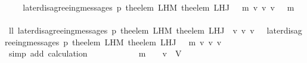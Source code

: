 \begin{isabellebody}
\ \isamarkupfalse%
\ \isamarkupfalse%
\ {\isachardoublequoteopen}later{\isacharunderscore}disagreeing{\isacharunderscore}messages\ {\isacharparenleft}p{\isacharcomma}\ the{\isacharunderscore}elem\ {\isacharparenleft}L{\isacharunderscore}H{\isacharunderscore}M\ {\isacharparenleft}the{\isacharunderscore}elem\ {\isacharparenleft}L{\isacharunderscore}H{\isacharunderscore}J\ {\isacharparenleft}{\isasymsigma}\ {\isasymunion}\ {\isacharbraceleft}m{\isacharbraceright}{\isacharparenright}\ v{\isacharparenright}{\isacharparenright}\ v{\isacharprime}{\isacharparenright}{\isacharcomma}\ v{\isacharprime}{\isacharcomma}\ {\isasymsigma}\ {\isasymunion}\ {\isacharbraceleft}m{\isacharbraceright}{\isacharparenright}\ {\isacharequal}\ {\isasymemptyset}{\isachardoublequoteclose}\isanewline
\ \ \ \ \ \ \isamarkupfalse%
\ {\isacharminus}\isanewline
\ \ \ \ \ \ \ \ \isamarkupfalse%
\ ll{}{\isacharcolon}\ {\isachardoublequoteopen}later{\isacharunderscore}disagreeing{\isacharunderscore}messages\ {\isacharparenleft}p{\isacharcomma}\ the{\isacharunderscore}elem\ {\isacharparenleft}L{\isacharunderscore}H{\isacharunderscore}M\ {\isacharparenleft}the{\isacharunderscore}elem\ {\isacharparenleft}L{\isacharunderscore}H{\isacharunderscore}J\ {\isasymsigma}\ v{\isacharparenright}{\isacharparenright}\ v{\isacharprime}{\isacharparenright}{\isacharcomma}\ v{\isacharprime}{\isacharcomma}\ {\isasymsigma}{\isacharparenright}\ {\isacharequal}\ later{\isacharunderscore}disagreeing{\isacharunderscore}messages\ {\isacharparenleft}p{\isacharcomma}\ the{\isacharunderscore}elem\ {\isacharparenleft}L{\isacharunderscore}H{\isacharunderscore}M\ {\isacharparenleft}the{\isacharunderscore}elem\ {\isacharparenleft}L{\isacharunderscore}H{\isacharunderscore}J\ {\isacharparenleft}{\isasymsigma}\ {\isasymunion}\ {\isacharbraceleft}m{\isacharbraceright}{\isacharparenright}\ v{\isacharparenright}{\isacharparenright}\ v{\isacharprime}{\isacharparenright}{\isacharcomma}\ v{\isacharprime}{\isacharcomma}\ {\isasymsigma}{\isacharparenright}{\isachardoublequoteclose}\isanewline
\ \ \ \ \ \ \ \ \ \ \isamarkupfalse%
\ {\isacharparenleft}simp\ add{\isacharcolon}\ calculation{\isacharparenleft}{}{\isacharparenright}{\isacharparenright}\isanewline
\ \ \ \ \ \ \ \ \isamarkupfalse%
\ {\isachardoublequoteopen}{\isasymsigma}\ {\isasymunion}\ {\isacharbraceleft}m{\isacharbraceright}\ {\isasymin}\ {\isasymSigma}\ {\isasymand}\ v\ {\isasymin}\ V{\isachardoublequoteclose}\isanewline
\ \ \ \ \ \ \ \ \ \ \isamarkupfalse%

\end{isabellebody}
